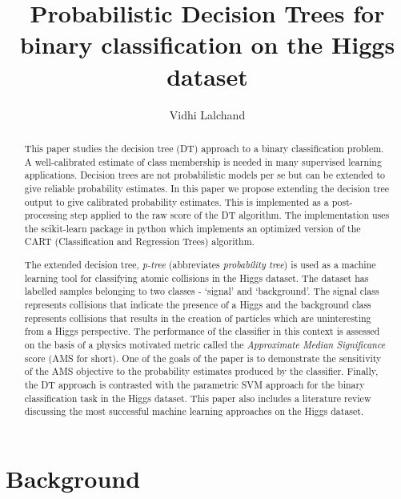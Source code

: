 \documentclass[final,3p,times,twocolumn]{elsarticle}
\begin{document}
\begin{frontmatter}

\title{Probabilistic Decision Trees for binary classification on the Higgs dataset}
\author{Vidhi Lalchand}
\address{Cavendish Laboratory, Department of Physics, J J Thomson Avenue, Cambridge. CB3 0HE}

\begin{abstract}
This paper studies the decision tree (DT) approach to a binary classification problem. A well-calibrated estimate of class membership is needed in many supervised learning applications. Decision trees are not probabilistic models per se but can be extended to give reliable probability estimates. In this paper we propose extending the decision tree output to give calibrated probability estimates. This is implemented as a post-processing step applied to the raw score of the DT algorithm. The implementation uses the scikit-learn package in python \cite{SKLEARN} which implements an optimized version of the CART (Classification and Regression Trees) algorithm.

The extended decision tree, \textit{p-tree} (abbreviates \textit{probability tree}) is used as a machine learning tool for classifying atomic collisions in the Higgs dataset. The dataset has labelled samples belonging to two classes - `signal' and `background'. The signal class represents collisions that indicate the presence of a Higgs and the background class represents collisions that results in the creation of particles which are uninteresting from a Higgs perspective. The performance of the classifier in this context is assessed on the basis of a physics motivated metric called the \textit{Approximate Median Significance} score (AMS for short). One of the goals of the paper is to demonstrate the sensitivity of the AMS objective to the probability estimates produced by the classifier. Finally, the DT approach is contrasted with the parametric SVM approach 
for the binary classification task in the Higgs dataset. This paper also includes a literature review discussing the most successful machine learning approaches on the Higgs dataset. 

\end{abstract}
\end{frontmatter}
\section{Background}
\end{document}
